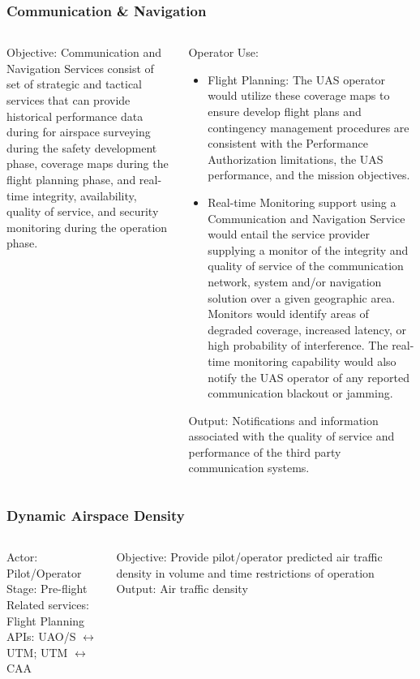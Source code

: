 \documentclass[usenames,dvipsnames,aspectratio=169,serif]{beamer}
\begin{document}
\begin{frame}
   \frametitle{Communication \& Navigation}
   \begin{columns}[t]
      \begin{column}{0.5\textwidth}
         Objective: Communication and Navigation Services consist of set of strategic and tactical services that can provide historical performance data during for airspace surveying during the safety development phase, coverage maps during the flight planning phase, and real-time integrity, availability, quality of service, and security monitoring during the operation phase.
      \end{column}
      \begin{column}{0.5\textwidth}
         Operator Use:
         \begin{itemize}
            \item  Flight Planning: The UAS operator would utilize these coverage maps to ensure develop flight plans and contingency management procedures are consistent with the Performance Authorization limitations, the UAS performance, and the mission objectives.
            \item  Real-time Monitoring support using a Communication and Navigation Service would entail the service provider supplying a monitor of the integrity and quality of service of the communication network, system and/or navigation solution over a given geographic area. Monitors would identify areas of degraded coverage, increased latency, or high probability of interference. The real-time monitoring capability would also notify the UAS operator of any reported communication blackout or jamming.
         \end{itemize}
         Output: Notifications and information associated with the quality of service and performance of the third party communication systems.
      \end{column}
   \end{columns}
\end{frame}

\begin{frame}
   \frametitle{Dynamic Airspace Density}
   \begin{columns}[t]
      \begin{column}{0.5\textwidth}
         Actor: Pilot/Operator \\
         Stage: Pre-flight \\
         Related services: Flight Planning \\
         APIs: UAO/S $\leftrightarrow$ UTM; UTM $\leftrightarrow$ CAA \\
      \end{column}
      \begin{column}{0.5\textwidth}
         Objective: Provide pilot/operator predicted air traffic density in volume and time restrictions of operation
         Output: Air traffic density
      \end{column}
   \end{columns}
\end{frame}
\end{document}

